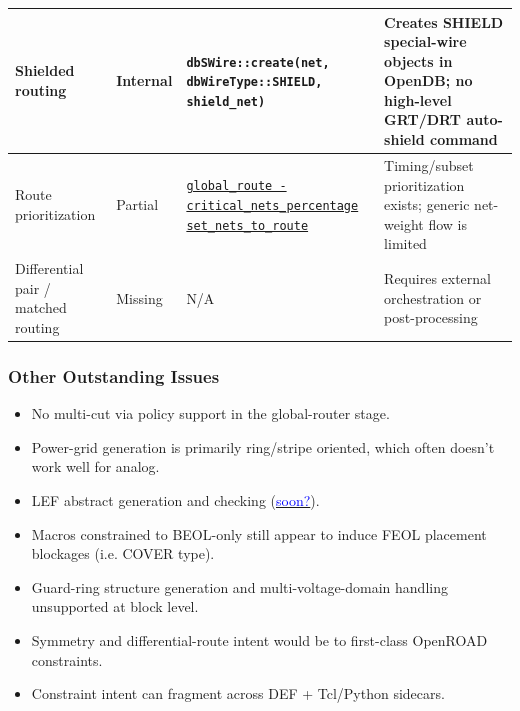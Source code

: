 \documentclass[aspectratio=169]{beamer}
\begin{document}
\begin{frame}
\begin{center}
\begin{tabular}{p{2.6cm}|p{1.2cm}|p{3.9cm}|p{4.0cm}}
      \hline
      Shielded routing &
      Internal &
      \texttt{dbSWire::create(net, dbWireType::SHIELD, shield\_net)} &
      Creates SHIELD special-wire objects in OpenDB; no high-level GRT/DRT auto-shield command \\
      \hline
      Route prioritization &
      Partial &
      \href{https://openroad.readthedocs.io/en/latest/main/src/grt/README.html\#global-route}{\texttt{global\_route -critical\_nets\_percentage}} \newline
      \href{https://openroad.readthedocs.io/en/latest/main/src/grt/README.html\#set-specific-nets-to-route}{\texttt{set\_nets\_to\_route}} &
      Timing/subset prioritization exists; generic net-weight flow is limited \\
      \hline
      Differential pair / matched routing &
      Missing &
      N/A &
      Requires external orchestration or post-processing \\
      \hline
    \end{tabular}
  \end{center}
\end{frame}

\begin{frame}
  \frametitle{Other Outstanding Issues}
  \small
  \begin{itemize}
    \item No multi-cut via policy support in the global-router stage.
    \item Power-grid generation is primarily ring/stripe oriented, which often doesn't work well for analog.
    \item LEF abstract generation and checking (\href{https://github.com/The-OpenROAD-Project/OpenROAD/issues/4872}{\textcolor{blue}{soon?}}).
    \item Macros constrained to BEOL-only still appear to induce FEOL placement blockages (i.e. COVER type).
    \item Guard-ring structure generation and multi-voltage-domain handling unsupported at block level.
    \item Symmetry and differential-route intent would be to first-class OpenROAD constraints.
    \item Constraint intent can fragment across DEF + Tcl/Python sidecars.
  \end{itemize}
\end{frame}
\end{document}
